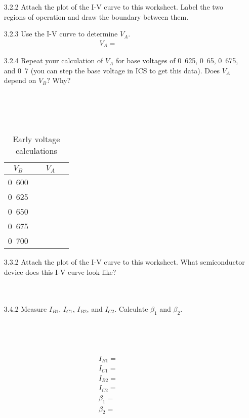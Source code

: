 \documentclass{article}
\begin{document}
\begin{enumerate}
\item[3.2.2] Attach the plot of the I-V curve to this worksheet. Label the two regions of operation and draw the boundary between them.

\item[3.2.3] Use the I-V curve to determine $V_A$.
  \begin{align*}
    \boxed{V_A = ~~~~~~~~~~~~~~~~~~~~~~ }
  \end{align*}

\item[3.2.4] Repeat your calculation of $V_A$ for base voltages of \unit{0.625}{\volt}, \unit{0.65}{\volt}, \unit{0.675}{\volt}, and \unit{0.7}{\volt} (you can step the base voltage in ICS to get this data). Does $V_A$ depend on $V_{B}$? Why?
  \\~\\~\\~\\~\\
  \begin{table}[!htb]
    \begin{center}
      \begin{tabular}{|c|c|} \hline
	$V_B$ & $V_A$ \\ \hline \hline
	\unit{0.600}{\volt} & ~~~~~~~ \\ \hline
	\unit{0.625}{\volt} & \\ \hline
	\unit{0.650}{\volt} & \\ \hline
	\unit{0.675}{\volt} & \\ \hline
	\unit{0.700}{\volt} & \\ \hline
      \end{tabular}
      \caption{Early voltage calculations}
      \label{Early}
    \end{center}
  \end{table}
  
\item[3.3.2] Attach the plot of the I-V curve to this worksheet. What semiconductor device does this I-V curve look like? 
  \\~\\~\\
  
\item[3.4.2] Measure $I_{B1}$, $I_{C1}$, $I_{B2}$, and $I_{C2}$.  Calculate $\beta_1$ and $\beta_2$.\\~\\~\\~\\~\\
  \begin{align*}
    \boxed{I_{B1} = ~~~~~~~~~~~~~~~~~~~~~~ } \\
    \boxed{I_{C1} = ~~~~~~~~~~~~~~~~~~~~~~ } \\
    \boxed{I_{B2} = ~~~~~~~~~~~~~~~~~~~~~~ } \\
    \boxed{I_{C2} = ~~~~~~~~~~~~~~~~~~~~~~ } \\
    \boxed{\beta_1 = ~~~~~~~~~~~~~~~~~~~~~~~ } \\
    \boxed{\beta_2 = ~~~~~~~~~~~~~~~~~~~~~~~ } \\
  \end{align*}
  

\end{enumerate}
\end{document}
